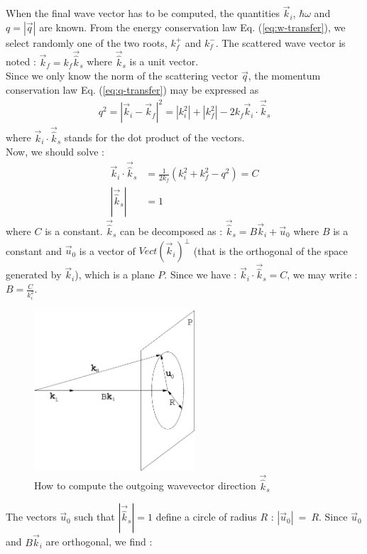 When the final wave vector has to be computed, the quantities $\vec{k}_i$, $\hbar \omega$ and $q = |\vec{q}|$ are known.
From the energy conservation law Eq. (\ref{eq:w-transfer}), we select randomly one of the two roots, $k_f^+$ and $k_f^-$.
The scattered wave vector is noted : $\vec{k}_f = k_f \vec{\hat k}_s$ where $\vec{\hat k}_s$ is a unit vector.\\
Since we only know the norm of the scattering vector $\vec{q}$, the momentum conservation law Eq. (\ref{eq:q-transfer}) may be expressed as
\begin{align} \label{eq:q2-transfer}
q^2 = |\vec{k}_i -\vec{k}_f|^2 = |k_i^2| + |k_f^2| - 2 k_f \vec{k}_i \cdot \vec{\hat k}_s
\end{align}
where $\vec{k}_i \cdot \vec{\hat k}_s$ stands for the dot product of the vectors.\\
Now, we should solve :
\begin{align}
\vec{k}_i \cdot \vec{\hat k}_s &= \frac{1}{2k_f} (k_i^2 + k_f^2 - q^2) = C \\
|\vec{\hat k}_s| &= 1
\end{align}
where $C$ is a constant.
$\vec{\hat k}_s$ can be decomposed as : $\vec{\hat k}_s = B \vec{k}_i + \vec{u}_0$ where $B$ is a constant and $\vec{u}_0$ is a vector of $Vect(\vec{k}_i)^{\bot}$ (that is the orthogonal of the space generated by $\vec{k}_i$), which is a plane $P$.
Since we have : $\vec{k}_i \cdot \vec{\hat k}_s = C$, we may write : $B = \frac{C}{k_i^2}$.
\begin{figure}[!h]
\begin{center}
\includegraphics*[height=6cm]{figures/calckf_2.eps}
\caption{How to compute the outgoing wavevector direction $\vec{\hat k}_s$}
\label{fig:ann_kf}
\end{center}
\end{figure}
The vectors $\vec{u}_0$ such that $|\vec{\hat k}_s| = 1$ define a circle of radius $R$ : $|\vec{u}_0|~=~R$.
Since $\vec{u}_0$ and $B \vec{k}_i$ are orthogonal, we find :
